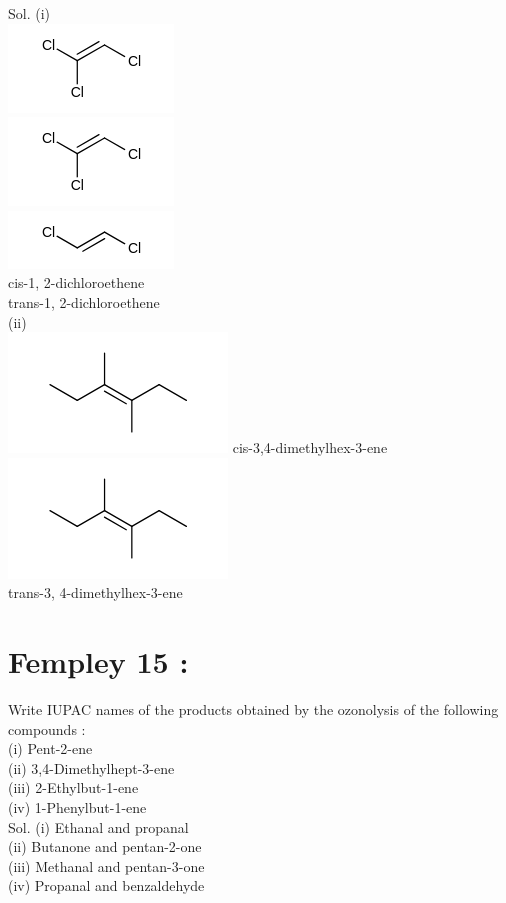 \documentclass[10pt]{article}
\begin{document}
Sol. (i)\\
\includegraphics{smile-c5f4e63ddc8e868cc506ba5ada91d26b259995cc}\\
\includegraphics{smile-13e37f0c184e54b5cc936d2f4f893eca7c022a08}\\
\includegraphics{smile-af6ccc143af475cf3ccb48ef0200a8c9f4aceae7}\\
cis-1, 2-dichloroethene\\
trans-1, 2-dichloroethene\\
(ii)\\
\includegraphics{smile-bd62da815eded000955f8b2ef04a5c28d701fc6e} cis-3,4-dimethylhex-3-ene\\
\includegraphics{smile-61de51fb65b495da84fca7723e2a507b1951f7ef}\\
trans-3, 4-dimethylhex-3-ene

\section*{Fempley 15 :}
Write IUPAC names of the products obtained by the ozonolysis of the following compounds :\\
(i) Pent-2-ene\\
(ii) 3,4-Dimethylhept-3-ene\\
(iii) 2-Ethylbut-1-ene\\
(iv) 1-Phenylbut-1-ene\\
Sol. (i) Ethanal and propanal\\
(ii) Butanone and pentan-2-one\\
(iii) Methanal and pentan-3-one\\
(iv) Propanal and benzaldehyde
\end{document}
